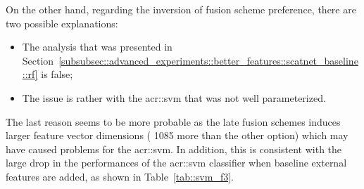             On the other hand, regarding the inversion of fusion scheme preference, there are two possible explanations:
            \begin{itemize}[label=\(\blacktriangleright\)]
                \item The analysis that was presented in Section~\ref{subsubsec::advanced_experiments::better_features::scatnet_baseline::rf} is false;
                \item The issue is rather with the \gls{acr::svm} that was not well parameterized.
            \end{itemize}
            The last reason seems to be more probable as the late fusion schemes induces larger feature vector dimensions ( 1085 more than the other option) which may have caused problems for the \gls{acr::svm}.
            In addition, this is consistent with the large drop in the performances of the \gls{acr::svm} classifier when baseline external features are added, as shown in Table~\ref{tab::svm_f3}.\\


